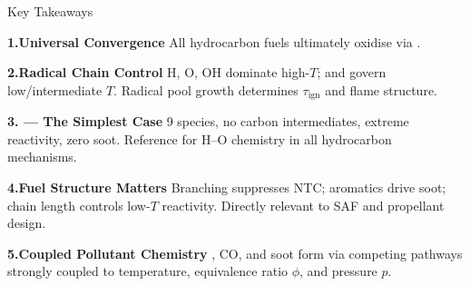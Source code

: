 \documentclass[aspectratio=169,10pt]{beamer}
\begin{document}
\begin{frame}{Key Takeaways}
  \setlength{\parskip}{0pt}
  {\footnotesize
  \begin{block}{\color{ITUorange}\bfseries 1.\enspace Universal  Convergence}
    All hydrocarbon fuels ultimately oxidise via .
  \end{block}\vspace{-4pt}
  \begin{block}{\color{ITUsky}\bfseries 2.\enspace Radical Chain Control}
    H, O, OH dominate high-$T$;  and  govern low/intermediate $T$.
    Radical pool growth determines $\tau_\text{ign}$ and flame structure.
  \end{block}\vspace{-4pt}
  \begin{block}{\color{ITUgreen}\bfseries 3.\enspace {} --- The Simplest Case}
    9 species, no carbon intermediates, extreme reactivity, zero soot.
    Reference for H--O chemistry in all hydrocarbon mechanisms.
  \end{block}\vspace{-4pt}
  \begin{block}{\color{ITUgold}\bfseries 4.\enspace Fuel Structure Matters}
    Branching suppresses NTC; aromatics drive soot; chain length controls
    low-$T$ reactivity. Directly relevant to SAF and propellant design.
  \end{block}\vspace{-4pt}
  \begin{alertblock}{\bfseries 5.\enspace Coupled Pollutant Chemistry}
    , CO, and soot form via competing pathways strongly coupled to
    temperature, equivalence ratio $\phi$, and pressure $p$.
  \end{alertblock}}
\end{frame}
\end{document}
